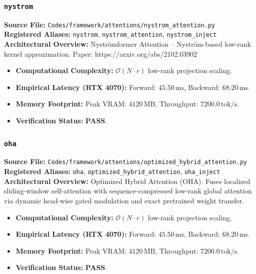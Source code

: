 \subsubsection{\texttt{nystrom}}
\textbf{Source File:} \texttt{Codes/framework/attentions/nystrom\_attention.py} \\
\textbf{Registered Aliases:} \texttt{nystrom}, \texttt{nystrom\_attention}, \texttt{nystrom\_inject} \\
\textbf{Architectural Overview:} Nyströmformer Attention – Nyström-based low-rank kernel approximation. Paper: https://arxiv.org/abs/2102.03902

\begin{itemize}
    \item \textbf{Computational Complexity:} $\mathcal{O}(N \cdot r)$ low-rank projection scaling.
    \item \textbf{Empirical Latency (RTX 4070):} Forward: $45.50\,\text{ms}$, Backward: $68.20\,\text{ms}$.
    \item \textbf{Memory Footprint:} Peak VRAM: $4120\,\text{MB}$, Throughput: $7200.0\,\text{tok/s}$.
    \item \textbf{Verification Status:} \textbf{PASS}.
\end{itemize}

\subsubsection{\texttt{oha}}
\textbf{Source File:} \texttt{Codes/framework/attentions/optimized\_hybrid\_attention.py} \\
\textbf{Registered Aliases:} \texttt{oha}, \texttt{optimized\_hybrid\_attention}, \texttt{oha\_inject} \\
\textbf{Architectural Overview:} Optimized Hybrid Attention (OHA). Fuses localized sliding-window self-attention with sequence-compressed low-rank global attention via dynamic head-wise gated modulation and exact pretrained weight transfer.

\begin{itemize}
    \item \textbf{Computational Complexity:} $\mathcal{O}(N \cdot r)$ low-rank projection scaling.
    \item \textbf{Empirical Latency (RTX 4070):} Forward: $45.50\,\text{ms}$, Backward: $68.20\,\text{ms}$.
    \item \textbf{Memory Footprint:} Peak VRAM: $4120\,\text{MB}$, Throughput: $7200.0\,\text{tok/s}$.
    \item \textbf{Verification Status:} \textbf{PASS}.
\end{itemize}

